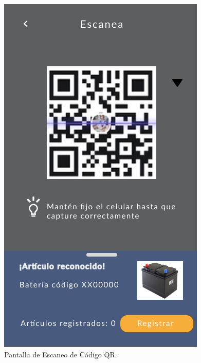 \documentclass{scrreprt}
\begin{document}
    \begin{figure}[!htpb]
        \centerline{\includegraphics[scale=.35]{images/prototype/mobile/iPhone 8 - 3.png}}
        \caption{Pantalla de Escaneo de Código QR.}
        \label{fig}
    \end{figure}
    \FloatBarrier
\end{document}
